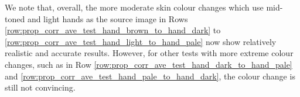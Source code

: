 We note that, overall, the more moderate skin colour changes which use mid-toned and light hands as the source image in Rows \ref{row:prop_corr_ave_test_hand_brown_to_hand_dark} to \ref{row:prop_corr_ave_test_hand_light_to_hand_pale} now show relatively realistic and accurate results. However, for other tests with more extreme colour changes, such as in Row \ref{row:prop_corr_ave_test_hand_dark_to_hand_pale} and \ref{row:prop_corr_ave_test_hand_pale_to_hand_dark}, the colour change is still not convincing.
